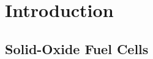 

\renewcommand{\thechapter}{1}

\chapter{Introduction}

\section{Solid-Oxide Fuel Cells}

\lipsum\cite{Wang2006a}
